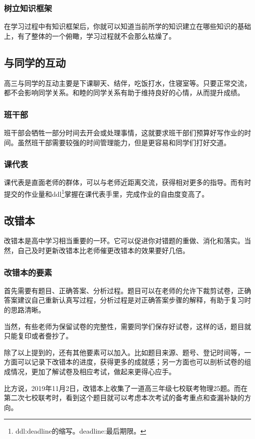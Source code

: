 \documentclass[UTF8,11pt,a4paper]{ctexart}
\begin{document}
			\subsubsection{树立知识框架}
				在学习过程中有知识框架后，你就可以知道当前所学的知识建立在哪些知识的基础上，有了整体的一个俯瞰，学习过程就不会那么枯燥了。
		\subsection{与同学的互动}
			高三与同学的互动主要是下课聊天、结伴，吃饭打水，住寝室等。只要正常交流，都不会影响同学关系。和睦的同学关系有助于维持良好的心情，从而提升成绩。
			\subsubsection{班干部}
				班干部会牺牲一部分时间去开会或处理事情，这就要求班干部们预算好写作业的时间。虽然班干部需要较强的时间管理能力，但是更容易和同学们打好交道。
			\subsubsection{课代表}
				课代表是直面老师的群体，可以与老师近距离交流，获得相对更多的指导。而有时提交的作业量和ddl\footnote{ddl:deadline的缩写。deadline:最后期限。}掌握在课代表手里，完成作业的自由度变高了。
		\subsection{改错本}
			改错本是高中学习相当重要的一环。它可以促进你对错题的重做、消化和落实。当然，自己及时更新改错本比老师催更改错本的效果要好几倍。
			\subsubsection{改错本的要素}
				首先需要有题目、正确答案、分析过程。题目可以在老师的允许下裁剪试卷，正确答案建议自己重新认真写过程，分析过程是对正确答案步骤的解释，有助于复习时的思路清晰。
				
				当然，有些老师为保留试卷的完整性，需要同学们保存好试卷，这样的话，题目就只能复印或者誊抄了。
				
				除了以上提到的，还有其他要素可以加入。比如题目来源、题号、登记时间等，一方面可以记录下改错本的进度，获得更多的成就感；另一方面也可以剖析试卷的组成情况，更加了解试卷及相应考试，做起来更得心应手。
				
				比方说，2019年11月2日，改错本上收集了一道高三年级七校联考物理25题。而在第二次七校联考时，看到这个题目就可以考虑本次考试的备考重点和查漏补缺的方向。
\end{document}

